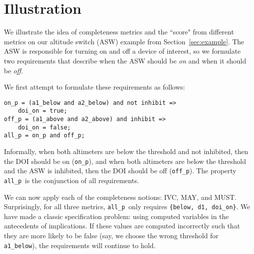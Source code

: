 \section{Illustration}
\label{sec:illust}

\newcommand{\allp}{\texttt{all\_p}}
\newcommand{\onp}{\texttt{on\_p}}
\newcommand{\offp}{\texttt{off\_p}}
\newcommand{\hystp}{\texttt{hyst\_p}}
\newcommand{\aonebelow}{\texttt{a1\_below}}
\newcommand{\atwobelow}{\texttt{a2\_below}}
\newcommand{\aoneabove}{\texttt{a1\_above}}
\newcommand{\atwoabove}{\texttt{a2\_above}}
\newcommand{\doion}{\texttt{doi\_on}}
\newcommand{\done}{\texttt{d1}}
\newcommand{\dtwo}{\texttt{d2}}
\newcommand{\abovehyst}{\texttt{above\_hyst}}
\newcommand{\inhibit}{\texttt{inhibit}}

We illustrate the idea of completeness metrics and the ``score" from different metrics on our altitude switch (ASW) example from Section~\ref{sec:example}.  %
%
The ASW is responsible for turning on and off a device of interest, so we formulate two requirements that describe when the ASW should be {\em on} and when it should be {\em off}.

We first attempt to formulate these requirements as follows:

{\smaller
\begin{verbatim}
on_p = (a1_below and a2_below) and not inhibit =>
    doi_on = true;
off_p = (a1_above and a2_above) and inhibit =>
    doi_on = false;
all_p = on_p and off_p;
\end{verbatim}
}

\noindent Informally, when both altimeters are below the threshold and not inhibited, then the DOI should be on (\onp), and when both altimeters are below the threshold and the ASW is inhibited, then the DOI should be off (\offp).  The property \allp\ is the conjunction of all requirements.  

We can now apply each of the completeness notions: IVC, MAY, and MUST.  Surprisingly, for all three metrics, \allp\ only requires \texttt{\{below, d1, doi\_on\}}.  We have made a classic specification problem: using computed variables in the antecedents of implications.  If these values are computed incorrectly such that they are more likely to be false (say, we choose the wrong threshold for \aonebelow), the requirements will continue to hold.


